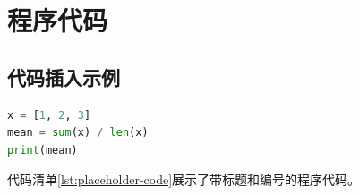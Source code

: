 \section{程序代码}


\subsection{代码插入示例}
\begin{lstlisting}[style=cumcmcode,language=Python,caption={Python 占位代码示例},label={lst:placeholder-code}]
x = [1, 2, 3]
mean = sum(x) / len(x)
print(mean)
\end{lstlisting}
代码清单\ref{lst:placeholder-code}展示了带标题和编号的程序代码。
